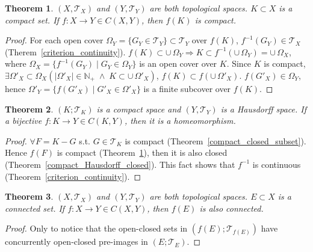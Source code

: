 \documentclass[openany]{book}
\theoremstyle{plain}
\newtheorem{theorem}{Theorem}[section] %
\theoremstyle{definition}
\begin{document}
\begin{theorem}\label{compact_continuous}
$(X,\mathscr{T}_X)$ and $(Y,\mathscr{T}_Y)$ are both topological spaces. $K\subset X$ is a compact set. If $f: X\to Y \in C( X, Y)$, then $f( K)$ is compact.
\end{theorem}
\begin{proof}
For each open cover $\Omega_Y = \{ G_Y \in \mathscr{T}_Y\} \subset \mathscr{T}_Y$ over $f( K)$, $f ^{-1} ( G_Y) \in \mathscr{T}_X$ (Therem~\ref{criterion_continuity}). $f( K) \subset \cup\,\Omega_Y \Rightarrow K \subset f ^{-1} \left(  \cup\,\Omega_Y \right) = \cup\,\Omega_X $, where $\Omega_X = \{ f ^{-1} ( G_Y) \mid G_Y \in \Omega_Y\} $ is an open cover over $K$. Since $K$ is compact,
$\exists \Omega'_X \subset \Omega_X\left( 
\lvert \Omega'_X \rvert \in \mathbb{N}_+ 
\;\wedge\;K\subset \cup\,\Omega'_X
\right)$, $f( K) \subset f ( \cup\,\Omega'_X) $. $f ( G'_X) \in \Omega_Y$, hence $\Omega'_Y = \{ f ( G'_X) \mid G'_X \in \Omega'_X\}$ is a finite subcover over $f( K)$.
\end{proof}
\begin{theorem}\label{compact_Hausdorff_continuous_homeomorphism}
$(K;\mathscr{T}_K)$ is a compact space and $(Y,\mathscr{T}_Y)$ is a Hausdorff space. If a bijective $f: K\to Y \in C( K, Y)$, then it is a homeomorphism.
\end{theorem}
\begin{proof}
$\forall F = K - G$ s.t. $G \in \mathscr{T}_K$ is compact (Theorem~\ref{compact_closed_subset}). Hence $f ( F) $ is compact (Theorem~\ref{compact_continuous}), then it is also closed
(Theorem~\ref{compact_Hausdorff_closed}). This fact shows that $f ^{-1}$ is continuous (Theorem~\ref{criterion_continuity}).
\end{proof}
\begin{theorem}\label{connected_continuous}
$(X,\mathscr{T}_X)$ and $(Y,\mathscr{T}_Y)$ are both topological spaces. $E\subset X$ is a connected set. If $f: X\to Y \in C( X, Y)$, then $f( E)$ is also connected.
\end{theorem}
\begin{proof}
Only to notice that the open-closed sets in $( f( E) ; \mathscr{T}_{ f( E)})$ have concurrently open-closed pre-images in $( E; \mathscr{T}_E)$.
\end{proof}
\end{document}
